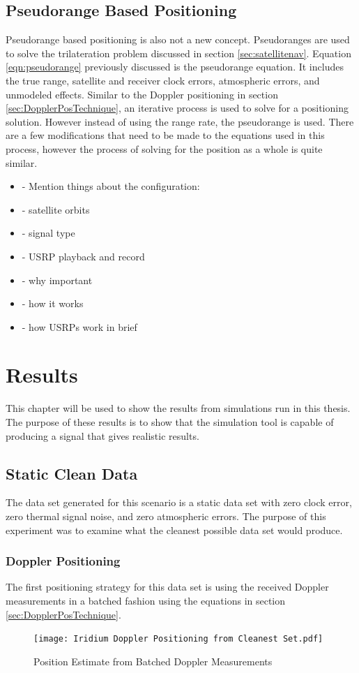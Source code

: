 \documentclass[12pt]{report}
\begin{document}
\section{Pseudorange Based Positioning} \label{sec:PseudorangePosTechnique}
Pseudorange based positioning is also not a new concept. Pseudoranges are used to solve the trilateration problem discussed in section \ref{sec:satellitenav}. Equation \ref{eqn:pseudorange} previously discussed is the pseudorange equation. It includes the true range, satellite and receiver clock errors, atmospheric errors, and unmodeled effects. Similar to the Doppler positioning in section \ref{sec:DopplerPosTechnique}, an iterative process is used to solve for a positioning solution. However instead of using the range rate, the pseudorange is used. There are a few modifications that need to be made to the equations used in this process, however the process of solving for the position as a whole is quite similar. 
\begin{itemize}
    \item     - Mention things about the configuration:
    \item     - satellite orbits
    \item     - signal type
    \item     - USRP playback and record
    \item     - why important
    \item     - how it works
    \item     - how USRPs work in brief

\end{itemize}


\chapter{Results}

This chapter will be used to show the results from simulations run in this thesis. The purpose of these results is to show that the simulation tool is capable of producing a signal that gives realistic results. 

\section{Static Clean Data}
The data set generated for this scenario is a static data set with zero clock error, zero thermal signal noise, and zero atmospheric errors. The purpose of this experiment was to examine what the cleanest possible data set would produce.  
\subsection{Doppler Positioning}
The first positioning strategy for this data set is using the received Doppler measurements in a batched fashion using the equations in section \ref{sec:DopplerPosTechnique}. 
\begin{figure}[h!]
    \centering
    \texttt{[image: Iridium Doppler Positioning from Cleanest Set.pdf]}
    \caption{Position Estimate from Batched Doppler Measurements}
    \label{fig:cleaniriddopgeo}
\end{figure}
\end{document}
